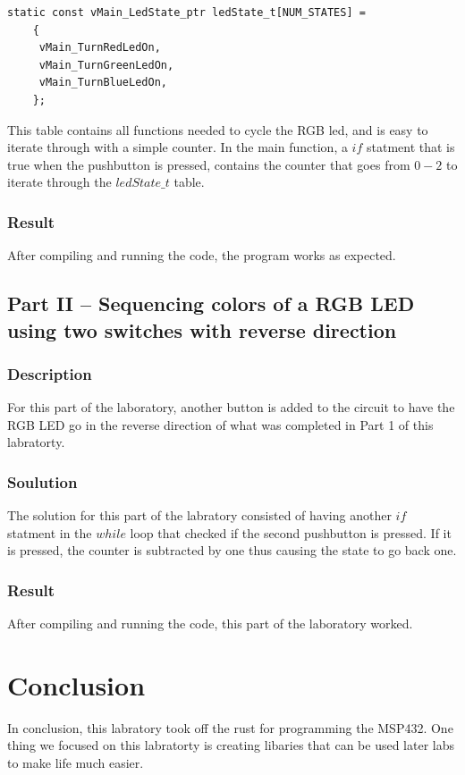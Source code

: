 \documentclass[11pt,a4paper]{article}
\begin{document}
  \begin{lstlisting}[style=functionStyle]
    static const vMain_LedState_ptr ledState_t[NUM_STATES] =
    {
     vMain_TurnRedLedOn,
     vMain_TurnGreenLedOn,
     vMain_TurnBlueLedOn,
    };
  \end{lstlisting}
\noindent
  This table contains all functions needed to cycle the RGB led, and is easy to iterate through with a simple counter.
  In the main function, a \(if\) statment that is true when the pushbutton is pressed, contains the counter that goes 
  from \(0 - 2\) to iterate through the \(ledState\_t\) table.

  \subsubsection{Result}
  After compiling and running the code, the program works as expected.

\subsection{Part II – Sequencing colors of a RGB LED using two switches with reverse direction}
\subsubsection{Description}
For this part of the laboratory, another button is added to the circuit to have the RGB LED go in the reverse direction of what was completed
in Part 1 of this labratorty.

\subsubsection{Soulution}
The solution for this part of the labratory consisted of having another \(if\) statment in the \(while\) loop that checked if the second 
pushbutton is pressed. If it is pressed, the counter is subtracted by one thus causing the state to go back one.

\subsubsection{Result}
After compiling and running the code, this part of the laboratory worked.

\newpage

\section{Conclusion}
In conclusion, this labratory took off the rust for programming the MSP432. One thing we focused on this labratorty is creating libaries that 
can be used later labs to make life much easier.
\end{document}
